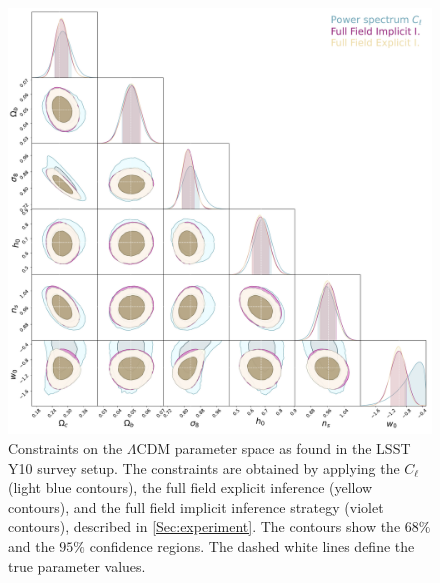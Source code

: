 \documentclass{aa}
\begin{document}
\begin{figure}
    \centering
\includegraphics[width=\textwidth]{figures/contours_posterior_imp_ex_ps.pdf}
    \caption{
Constraints on the $\Lambda$CDM parameter space as found in the LSST Y10 survey setup. The constraints are obtained by applying the $C_{\ell}$ (light blue contours), the full field explicit inference (yellow contours), and the full field implicit inference strategy (violet contours), described in \autoref{Sec:experiment}.
The contours show the $68\%$ and the $95\%$  confidence regions. The dashed white lines define the true parameter values.}
\label{fig:contours_posterior_imp_ex_ps}
\end{figure}
\end{document}
